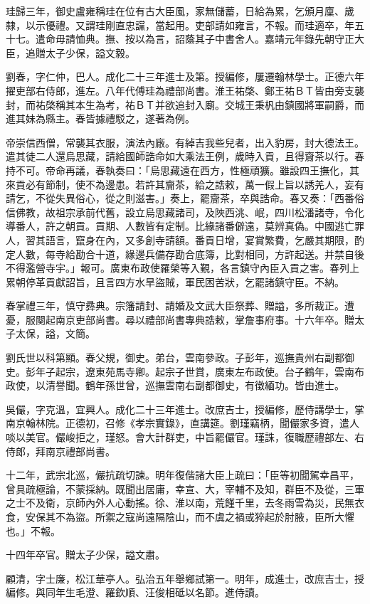 \begin{pinyinscope}
珪歸三年，御史盧雍稱珪在位有古大臣風，家無儲蓄，日給為累，乞頒月廩、歲隸，以示優禮。又謂珪剛直忠讜，當起用。吏部請如雍言，不報。而珪適卒，年五十七。遣命毋請恤典。撫、按以為言，詔蔭其子中書舍人。嘉靖元年錄先朝守正大臣，追贈太子少保，謚文毅。

劉春，字仁仲，巴人。成化二十三年進士及第。授編修，屢遷翰林學士。正德六年擢吏部右侍郎，進左。八年代傅珪為禮部尚書。淮王祐棨、鄭王祐ＢＴ皆由旁支襲封，而祐棨稱其本生為考，祐ＢＴ并欲追封入廟。交城王秉杋由鎮國將軍嗣爵，而進其妹為縣主。春皆據禮駁之，遂著為例。

帝崇信西僧，常襲其衣服，演法內廠。有綽吉我些兒者，出入豹房，封大德法王。遣其徒二人還烏思藏，請給國師誥命如大乘法王例，歲時入貢，且得齎茶以行。春持不可。帝命再議，春執奏曰：「烏思藏遠在西方，性極頑獷。雖設四王撫化，其來貢必有節制，使不為邊患。若許其齎茶，給之誥敕，萬一假上旨以誘羌人，妄有請乞，不從失異俗心，從之則滋害。」奏上，罷齎茶，卒與誥命。春又奏：「西番俗信佛教，故祖宗承前代舊，設立烏思藏諸司，及陜西洮、岷，四川松潘諸寺，令化導番人，許之朝貢。貢期、人數皆有定制。比緣諸番僻遠，莫辨真偽。中國逃亡罪人，習其語言，竄身在內，又多創寺請額。番貢日增，宴賞繁費，乞嚴其期限，酌定人數，每寺給勘合十道，緣邊兵備存勘合底簿，比對相同，方許起送。并禁自後不得濫營寺宇。」報可。廣東布政使羅榮等入覲，各言鎮守內臣入貢之害。春列上累朝停革貢獻詔旨，且言四方水旱盜賊，軍民困苦狀，乞罷諸鎮守臣。不納。

春掌禮三年，慎守彞典。宗籓請封、請婚及文武大臣祭葬、贈謚，多所裁正。遭憂，服闋起南京吏部尚書。尋以禮部尚書專典誥敕，掌詹事府事。十六年卒。贈太子太保，謚，文簡。

劉氏世以科第顯。春父規，御史。弟台，雲南參政。子彭年，巡撫貴州右副都御史。彭年子起宗，遼東苑馬寺卿。起宗子世賞，廣東左布政使。台子鶴年，雲南布政使，以清譽聞。鶴年孫世曾，巡撫雲南右副都御史，有徵緬功。皆由進士。

吳儼，字克溫，宜興人。成化二十三年進士。改庶吉士，授編修，歷侍講學士，掌南京翰林院。正德初，召修《孝宗實錄》，直講筵。劉瑾竊柄，聞儼家多資，遣人啖以美官。儼峻拒之，瑾怒。會大計群吏，中旨罷儼官。瑾誅，復職歷禮部左、右侍郎，拜南京禮部尚書。

十二年，武宗北巡，儼抗疏切諫。明年復偕諸大臣上疏曰：「臣等初聞駕幸昌平，曾具疏極論，不蒙採納。既聞出居庸，幸宣、大，宰輔不及知，群臣不及從，三軍之士不及衛，京師內外人心動搖。徐、淮以南，荒饉千里，去冬雨雪為災，民無衣食，安保其不為盜。所禦之寇尚遠隔陰山，而不虞之禍或猝起於肘腋，臣所大懼也。」不報。

十四年卒官。贈太子少保，謚文肅。

顧清，字士廉，松江華亭人。弘治五年舉鄉試第一。明年，成進士，改庶吉士，授編修。與同年生毛澄、羅欽順、汪俊相砥以名節。進侍讀。


\end{pinyinscope}
